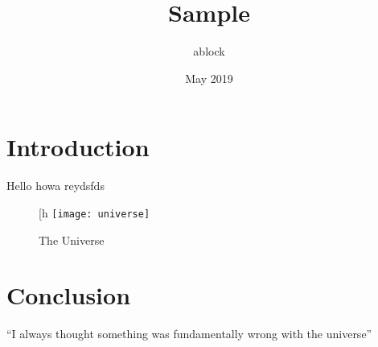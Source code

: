 \documentclass{article}
\title{Sample}
\author{ablock }
\date{May 2019}
\begin{document}
\maketitle

\section{Introduction}
Hello howa reydsfds 
\begin{figure}[h
\centering
\texttt{[image: universe]}
\caption{The Universe}
\label{fig:universe}
\end{figure}

\section{Conclusion}
``I always thought something was fundamentally wrong with the universe'' \citep{adams1995hitchhiker}



\end{document}
